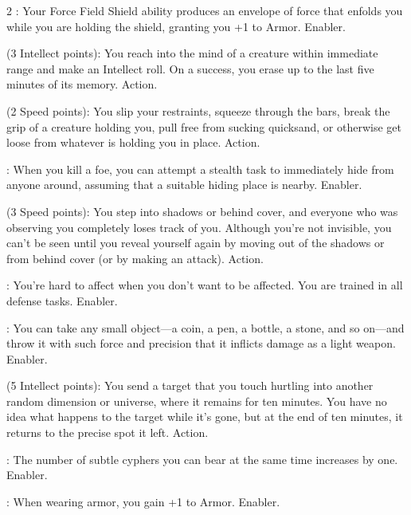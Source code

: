 \begin{multicols}{2}
: Your Force Field Shield ability produces an envelope of force that enfolds you while you are holding the shield, granting you +1 to Armor. Enabler. 
 
 (3 Intellect points): You reach into the mind of a creature within immediate range and make an Intellect roll. On a success, you erase up to the last five minutes of its memory. Action. 
 
 (2 Speed points): You slip your restraints, squeeze through the bars, break the grip of a creature holding you, pull free from sucking quicksand, or otherwise get loose from whatever is holding you in place. Action. 
 
: When you kill a foe, you can attempt a stealth task to immediately hide from anyone around, assuming that a suitable hiding place is nearby. Enabler. 
 
 (3 Speed points): You step into shadows or behind cover, and everyone who was observing you completely loses track of you. Although you’re not invisible, you can’t be seen until you reveal yourself again by moving out of the shadows or from behind cover (or by making an attack). Action. 
 
: You’re hard to affect when you don’t want to be affected. You are trained in all defense tasks. Enabler.
 
: You can take any small object—a coin, a pen, a bottle, a stone, and so on—and throw it with such force and precision that it inflicts damage as a light weapon. Enabler. 
 
 (5 Intellect points): You send a target that you touch hurtling into another random dimension or universe, where it remains for ten minutes. You have no idea what happens to the target while it’s gone, but at the end of ten minutes, it returns to the precise spot it left. Action. 

: The number of subtle cyphers you can bear at the same time increases by one. Enabler. 
 
: When wearing armor, you gain +1 to Armor. Enabler. 
 

\end{multicols}
